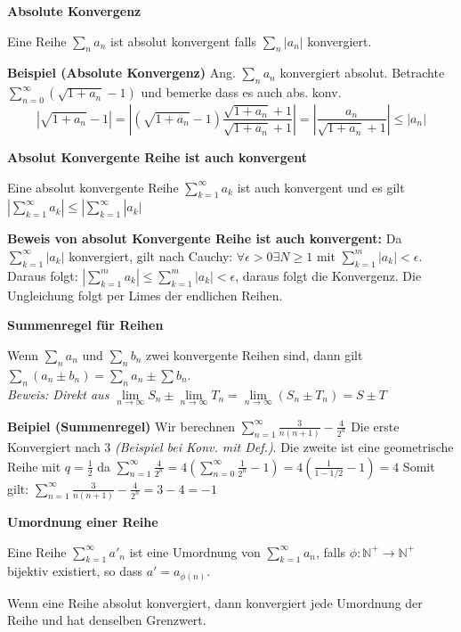 \documentclass[25pt]{sciposter}
\newcommand{\limm}{\lim\limits_{n \to \infty}}
\newcommand{\N}{\mathbb{N}}
\newenvironment{method}[1]{\begin{mdframed}[backgroundcolor=blue!10,innertopmargin=15pt, innerbottommargin=15pt, nobreak=true]
		\textbf{#1 }
	}
	{ 
	\end{mdframed}
}
\begin{document}
\begin{multicols}{3}
\begin{method}{Absolute Konvergenz}
	Eine Reihe $\sum_{n} a_n$ ist absolut konvergent falls $\sum_{n} |a_n|$ konvergiert.
\end{method}

\textbf{Beispiel (Absolute Konvergenz)} Ang. $\sum_{n} a_n$ konvergiert absolut. Betrachte $\sum_{n=0}^{\infty} (\sqrt{1 + a_n} -1)$ und bemerke dass es auch abs. konv.
$$\left|\sqrt{1 + a_n} -1\right| = \left| (\sqrt{1 + a_n} -1) \frac{\sqrt{1 + a_n} +1}{\sqrt{1 + a_n} +1} \right| = \left| \frac{a_n}{\sqrt{1 + a_n} + 1} \right| \leq |a_n|$$


\begin{method}{Absolut Konvergente Reihe ist auch konvergent}
Eine absolut konvergente Reihe $\sum _{k=1} ^{\infty} a_k$ ist auch konvergent und es gilt $\left|\sum_{k=1}^{\infty} a_k \right| \leq |\sum_{k=1}^{\infty} |a_k|$
\end{method}
\textbf{Beweis von absolut Konvergente Reihe ist auch konvergent:} Da $\sum_{k=1}^{\infty} |a_k|$ konvergiert, gilt nach Cauchy: $\forall \epsilon > 0 \exists N \geq 1$ mit $\sum_{k=1}^{m} |a_k| < \epsilon$. Daraus folgt: $\left| \sum_{k=1}^{m} a_k \right| \leq \sum_{k=1}^{m} |a_k| < \epsilon$, daraus folgt die Konvergenz. Die Ungleichung folgt per Limes der endlichen Reihen.

\begin{method}{Summenregel für Reihen}
	Wenn $\sum_n a_n$ und $\sum_n b_n$ zwei konvergente Reihen sind, dann gilt $\sum_n (a_n \pm b_n ) = \sum_n a_n \pm \sum b_n$.\\
	\textit{Beweis: Direkt aus $\limm S_n \pm \limm T_n = \limm (S_n \pm T_n)  = S \pm T$}
\end{method}
\textbf{Beipiel (Summenregel)}
Wir berechnen $\sum_{n=1}^\infty \frac{3}{n(n+1)} - \frac{4}{2^n}$ Die erste Konvergiert nach $3$ \textit{(Beispiel bei Konv. mit Def.)}. Die zweite ist eine geometrische Reihe mit $q=\frac{1}{2}$ da $\sum_{n=1}^{\infty} \frac{4}{2^n} = 4\left( \sum_{n=0}^{\infty} \frac{1}{2^n} -1 \right) = 4 \left( \frac{1}{1-1/2} -1\right) = 4$
Somit gilt: $\sum_{n=1}^\infty \frac{3}{n(n+1)} - \frac{4}{2^n} = 3-4 = -1$ 


\begin{method}{Umordnung einer Reihe}
	Eine Reihe $\sum_{k=1}^{\infty} a'_n$ ist eine Umordnung von $\sum_{k=1}^{\infty} a_n$, falls $\phi : \N^+ \to \N^+$ bijektiv existiert, so dass $a' = a_{\phi(n)}$.
	
	Wenn eine Reihe absolut konvergiert, dann konvergiert jede Umordnung der Reihe und hat denselben Grenzwert.
	

\end{method}
\end{multicols}
\end{document}
